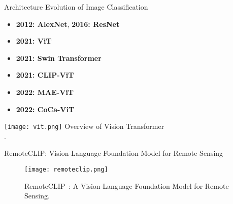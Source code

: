 \begin{refsection}
  \begin{frame}{Architecture Evolution of Image Classification}
    \begin{minipage}{0.48\linewidth}
      {\small
      \begin{itemize}
        \item \textbf{2012: AlexNet}, \textbf{2016: ResNet}
        \item \textbf{2021: ViT} \\
        \item \textbf{2021: Swin Transformer} \\
        \parencite{liuSwinTransformerHierarchical2021}
        \parencite{dosovitskiyImageWorth16x162020}
        \item \textbf{2021: CLIP-ViT} \\
        \parencite{radfordLearningTransferableVisual2021}
        \item \textbf{2022: MAE-ViT} \\
        \parencite{heMaskedAutoencodersAre2022}
        \item \textbf{2022: CoCa-ViT} \\
        \parencite{yuCoCaContrastiveCaptioners2022}
      \end{itemize}
      }
    \end{minipage}%
    \hfill
    \begin{minipage}{0.48\linewidth}
      \centering
      \texttt{[image: vit.png]}
      \scriptsize Overview of Vision Transformer\\\parencite{dosovitskiyImageWorth16x162020}.
    \end{minipage}
    \bottomleftrefs
  \end{frame}
\end{refsection}

\begin{refsection}
  \begin{frame}{RemoteCLIP: Vision-Language Foundation Model for Remote Sensing}
    \begin{figure}
      \centering
      \texttt{[image: remoteclip.png]}
      \caption{\scriptsize RemoteCLIP~\parencite{liuRemoteCLIPVisionLanguage2024}: A Vision-Language Foundation Model for Remote Sensing.}
    \end{figure}
    \bottomleftrefs
  \end{frame}
\end{refsection}

